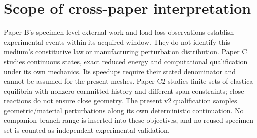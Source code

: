 \documentclass[11pt]{article}
\begin{document}
\section{Scope of cross-paper interpretation}
Paper B's specimen-level external work and load-loss observations establish experimental events within its acquired window. They do not identify this medium's constitutive law or manufacturing perturbation distribution. Paper C studies continuous states, exact reduced energy and computational qualification under its own mechanics. Its speedups require their stated denominator and cannot be assumed for the present meshes. Paper C2 studies finite sets of elastica equilibria with nonzero committed history and different span constraints; close reactions do not ensure close geometry. The present v2 qualification samples geometric/material perturbations along its own deterministic continuation. No companion branch range is inserted into these objectives, and no reused specimen set is counted as independent experimental validation.
\end{document}
